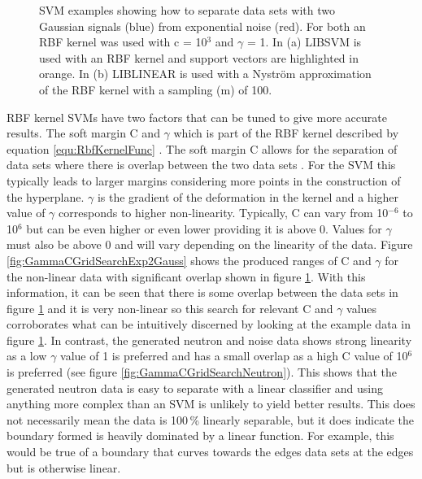 \begin{figure}[!h]
\begin{subfigure}{.5\textwidth}
  \captionsetup{width=.9\linewidth}
  \caption{}
  \label{subFig:exp_2NysGaussExample}
\end{subfigure}
\caption{SVM examples showing how to separate data sets with two Gaussian signals (blue) from exponential noise (red). For both an RBF kernel was used with c = 10$^3$ and $\gamma$ = 1. In (a) LIBSVM is used with an RBF kernel and support vectors are highlighted in orange. In (b) LIBLINEAR is used with a Nyström approximation of the RBF kernel with a sampling (m) of 100.}
\label{fig:svmExp_GausseExamples}
\end{figure}

RBF kernel SVMs have two factors that can be tuned to give more accurate results. The soft margin C and $\gamma$ which is part of the RBF kernel described by equation \ref{equ:RbfKernelFunc} \cite{Boser92atraining}. The soft margin C allows for the separation of data sets where there is overlap between the two data sets \cite{cortes1995support}. For the SVM this typically leads to larger margins considering more points in the construction of the hyperplane. $\gamma$ is the gradient of the deformation in the kernel and a higher value of $\gamma$ corresponds to higher non-linearity. Typically, C can vary from 10$^{-6}$ to 10$^6$ but can be even higher or even lower providing it is above 0. Values for $\gamma$ must also be above 0 and will vary depending on the linearity of the data. Figure \ref{fig:GammaCGridSearchExp2Gauss} shows the produced ranges of C and $\gamma$ for the non-linear data with significant overlap shown in figure \ref{subFig:exp_2NysGaussExample}. With this information, it can be seen that there is some overlap between the data sets  in figure \ref{subFig:exp_2NysGaussExample} and it is very non-linear so this search for relevant C and $\gamma$ values corroborates what can be intuitively discerned by looking at the example data in figure \ref{subFig:exp_2NysGaussExample}. In contrast, the generated neutron and noise data shows strong linearity as a low $\gamma$ value of 1 is preferred and has a small overlap as a high C value of 10$^6$ is preferred (see figure \ref{fig:GammaCGridSearchNeutron}). This shows that the generated neutron data is easy to separate with a linear classifier and using anything more complex than an SVM is unlikely to yield better results. This does not necessarily mean the data is 100\,\% linearly separable, but it does indicate the boundary formed is heavily dominated by a linear function. For example, this would be true of a boundary that curves towards the edges data sets at the edges but is otherwise linear. 

